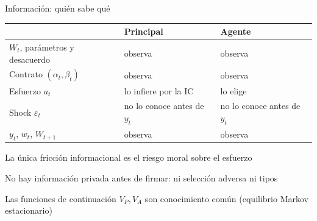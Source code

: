 \documentclass[12pt, aspectratio=169]{beamer}
\newenvironment{wideitemize}{\itemize\addtolength{\itemsep}{3pt}}{\enditemize}
\begin{document}
\begin{frame}{Información: quién sabe qué}
    \begin{center}
    \footnotesize
    \begin{tabular}{p{4.9cm}p{4.1cm}p{4.1cm}}
        \toprule
        & \textbf{Principal} & \textbf{Agente} \\
        \midrule
        $W_t$, parámetros y desacuerdo & observa & observa \\
        Contrato $(\alpha_t,\beta_t)$ & observa & observa \\
        Esfuerzo $a_t$ & lo infiere por la IC & lo elige \\
        Shock $\varepsilon_t$ & no lo conoce antes de $y_t$ & no lo conoce antes de $y_t$ \\
        $y_t$, $w_t$, $W_{t+1}$ & observa & observa \\
        \bottomrule
    \end{tabular}
    \end{center}
    \begin{wideitemize}
        \item La única fricción informacional es el riesgo moral sobre el esfuerzo
        \item No hay información privada antes de firmar: ni selección adversa ni tipos
        \item Las funciones de continuación $V_P,V_A$ son conocimiento común (equilibrio Markov estacionario)
    \end{wideitemize}
\end{frame}
\end{document}

